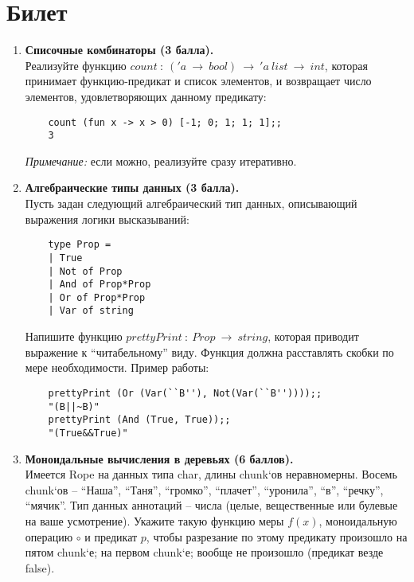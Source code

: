\documentclass[a4paper,11pt]{article}
\renewcommand{\emph}[1]{\textit{#1}}
\newcommand{\<}{\langle}
\renewcommand{\>}{\rangle}
\begin{document}
\section*{Билет }
\begin{enumerate}
\item \textbf{Списочные комбинаторы (3 балла).}\\
  Реализуйте функцию $count~:~('\!a~\rightarrow~bool)~
  \rightarrow~'\!a~list~\rightarrow~int$, которая принимает функцию-предикат 
  и список элементов, и возвращает число элементов, удовлетворяющих данному
  предикату:
  \begin{lstlisting}
    count (fun x -> x > 0) [-1; 0; 1; 1; 1];;
    3
  \end{lstlisting}
  \emph{Примечание:} если можно, реализуйте сразу итеративно.

\item \textbf{Алгебраические типы данных (3 балла).}\\
  Пусть задан следующий алгебраический тип данных, описывающий выражения 
  логики высказываний:
  \begin{lstlisting}
    type Prop =
    | True
    | Not of Prop
    | And of Prop*Prop
    | Or of Prop*Prop
    | Var of string
  \end{lstlisting}
  Напишите функцию $prettyPrint~:~Prop~\rightarrow~string$, которая приводит 
  выражение к ``читабельному'' виду. Функция должна расставлять скобки по мере
  необходимости. Пример работы:
  \begin{lstlisting}
    prettyPrint (Or (Var(``B''), Not(Var(``B''))));;
    "(B||~B)"
    prettyPrint (And (True, True));;
    "(True&&True)"
  \end{lstlisting}

\item \textbf{Моноидальные вычисления в деревьях (6 баллов).}\\
  Имеется Rope на данных типа char, длины chunk`ов неравномерны.
  Восемь chunk`ов -- ``Наша'', ``Таня'', ``громко'', ``плачет'',
  ``уронила'', ``в'', ``речку'', ``мячик''. Тип данных аннотаций --
  числа (целые, вещественные или булевые на ваше усмотрение). Укажите
  такую функцию меры $f(x)$, моноидальную операцию $\circ$ и предикат $p$,
  чтобы разрезание по этому предикату произошло на пятом chunk`е; на первом
  chunk`е; вообще не произошло (предикат везде false).
\end{enumerate}
\newpage 
\end{document}
